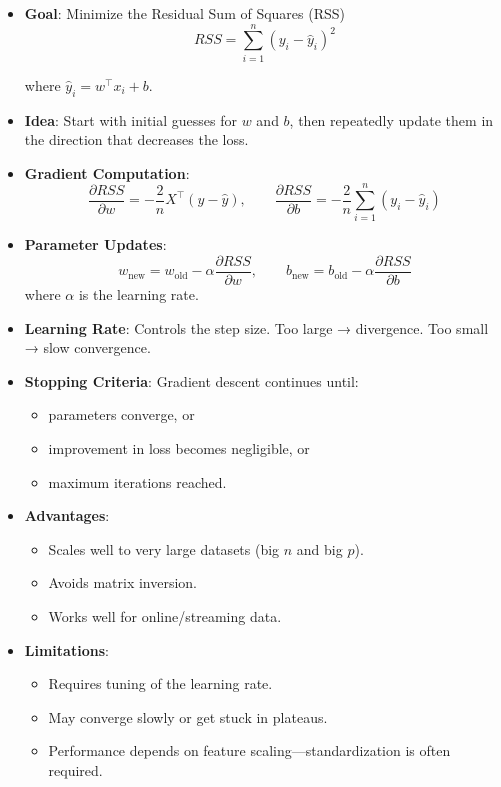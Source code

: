 \documentclass[10pt,a4paper]{article}
\begin{document}
	\begin{itemize}
		\item \textbf{Goal}: Minimize the Residual Sum of Squares (RSS)
		 			\[
			RSS = \sum_{i=1}^{n}(y_i - \hat{y}_i)^2
			\]

		where $\hat{y}_i = w^\top x_i + b$.

		\item \textbf{Idea}: Start with initial guesses for $w$ and $b$, then repeatedly update them in the direction that decreases the loss.

		\item \textbf{Gradient Computation}:
		 			\[
			\frac{\partial RSS}{\partial w} = -\frac{2}{n} X^\top (y - \hat{y}),
			\qquad
			\frac{\partial RSS}{\partial b} = -\frac{2}{n} \sum_{i=1}^{n}(y_i - \hat{y}_i)
			\]

		\item \textbf{Parameter Updates}:
		\[
		w_{\text{new}} = w_{\text{old}} - \alpha \frac{\partial RSS}{\partial w},
		\qquad
		b_{\text{new}} = b_{\text{old}} - \alpha \frac{\partial RSS}{\partial b}
		\]
		where $\alpha$ is the learning rate.

		\item \textbf{Learning Rate}: Controls the step size.
		Too large → divergence.
		Too small → slow convergence.

		\item \textbf{Stopping Criteria}:
		Gradient descent continues until:
		\begin{itemize}
			\item parameters converge, or
			\item improvement in loss becomes negligible, or
			\item maximum iterations reached.
		\end{itemize}

		\item \textbf{Advantages}:
		\begin{itemize}
			\item Scales well to very large datasets (big $n$ and big $p$).
			\item Avoids matrix inversion.
			\item Works well for online/streaming data.
		\end{itemize}

		\item \textbf{Limitations}:
		\begin{itemize}
			\item Requires tuning of the learning rate.
			\item May converge slowly or get stuck in plateaus.
			\item Performance depends on feature scaling—standardization is often required.
		\end{itemize}

	\end{itemize}
\end{document}
